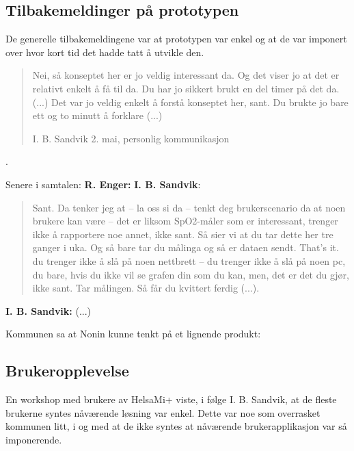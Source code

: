 \subsection{Tilbakemeldinger på prototypen}
De generelle tilbakemeldingene var at prototypen var enkel og at de var imponert over hvor kort tid det hadde tatt å utvikle den.
\blockquote[I. B. Sandvik 2. mai, personlig kommunikasjon]{Nei, så konseptet her er jo veldig interessant da. Og det viser jo at det er relativt enkelt å få til da.
Du har jo sikkert brukt en del timer på det da. (...) Det var jo veldig enkelt å forstå konseptet her, sant. Du brukte jo bare ett og to minutt å forklare (...)}{.}

Senere i samtalen:\newline
\textbf{R. Enger:}  \newline
\textbf{I. B. Sandvik}: \blockquote{Sant. Da tenker jeg at -- la oss si da -- tenkt deg brukerscenario da at noen brukere kan være -- det er liksom SpO2-måler som er
    interessant, trenger ikke å rapportere noe annet, ikke sant. Så sier vi at du tar dette her tre ganger i uka. Og så bare tar du målinga og så er dataen sendt. That's
    it. du trenger ikke å slå på noen nettbrett -- du trenger ikke å slå på noen pc, du bare, hvis du ikke vil se grafen din som du kan, men, det er det du gjør, ikke
sant. Tar målingen. Så får du kvittert ferdig (...).}

\textbf{I. B. Sandvik:}
 (...)

Kommunen sa at Nonin kunne tenkt på et lignende produkt: 

\subsection{Brukeropplevelse}
En workshop med brukere av HelsaMi+ viste, i følge I. B. Sandvik, at de fleste brukerne syntes nåværende løsning var enkel. Dette var noe som overrasket
kommunen litt, i og med at de ikke syntes at nåværende brukerapplikasjon var så imponerende.

